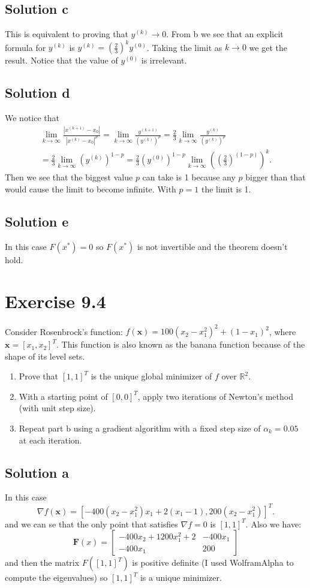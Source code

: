 \documentclass{article}
\newcommand{\bld}[1]{\boldsymbol{#1}}
\begin{document}
\subsection*{Solution c}
This is equivalent to proving that $y^{(k)}\to 0$. From b we see that an
explicit formula for $y^{(k)}$ is $y^{(k)}=\left(\frac{2}{3}\right)^ky^{(0)}$.
Taking the limit as $k\to 0$ we get the result. Notice that the value of
$y^{(0)}$ is irrelevant.
\subsection*{Solution d}
We notice that
\begin{multline*}
	\lim_{k\to \infty} \frac{|x^{(k+1)}-x_0|}{|x^{(k)}-x_0|^p} = \lim_{k\to
	\infty}\frac{y^{(k+1)}}{\left(y^{(k)}\right)^p}=
\frac{2}{3}\lim_{k\to\infty}\frac{y^{(k)}}{(y^{(k)})^p}\\
= \frac{2}{3}\lim_{k\to\infty}(y^{(k)})^{1-p} =
\frac{2}{3}(y^{(0)})^{1-p}\lim_{k\to\infty}\left(\left(\frac{2}{3}\right)^{(1-p)}\right)^k.
\end{multline*}
Then we see that the biggest value $p$ can take is 1 because any $p$ bigger
than that would cause the limit to become infinite. With $p=1$ the limit is 1.
\subsection*{Solution e}
In this case $F(x^*)=0$ so $F(x^*)$ is not invertible and the theorem doesn't
hold.
\section*{Exercise 9.4}
Consider Rosenbrock's function: $f(\bld{x})=100(x_2-x_1^2)^2+(1-x_1)^2$, where
$\bld{x}=[x_1,x_2]^T$. This function is also known as the banana function
because of the shape of its level sets.
\begin{enumerate}[label=\alph*.]
\item Prove that $[1,1]^T$ is the unique global minimizer of $f$ over
	$\mathbb{R}^2$.
\item With a starting point of $[0,0]^T$, apply two iterations of Newton's
	method (with unit step size).
\item Repeat part b using a gradient algorithm with a fixed step size of
	$\alpha_k=0.05$ at each iteration.
\end{enumerate}
\subsection*{Solution a}
In this case
\[
	\nabla f(\bld{x})=[-400(x_2-x_1^2)x_1+2(x_1-1),200(x_2-x_1^2)]^T.
\]
and we can se that the only point that satisfies $\nabla f=0$ is $[1,1]^T$.
Also we have:
\[
	\bld{F}(x)=\begin{bmatrix}
		-400x_2 + 1200x_1^2 + 2 & -400x_1 \\
		-400x_1 & 200
	\end{bmatrix}
\]
and then the matrix $F([1,1]^T)$ is positive definite (I used WolframAlpha to
compute the eigenvalues) so $[1,1]^T$ is a unique minimizer.
\end{document}
